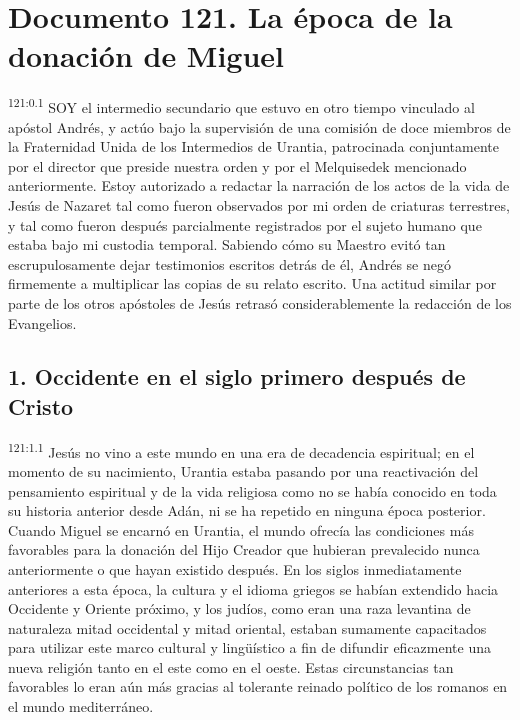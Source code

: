 \chapter{Documento 121. La época de la donación de Miguel}
\par 
\textsuperscript{121:0.1} SOY el intermedio secundario que estuvo en otro tiempo vinculado al apóstol Andrés, y actúo bajo la supervisión de una comisión de doce miembros de la Fraternidad Unida de los Intermedios de Urantia, patrocinada conjuntamente por el director que preside nuestra orden y por el Melquisedek mencionado anteriormente. Estoy autorizado a redactar la narración de los actos de la vida de Jesús de Nazaret tal como fueron observados por mi orden de criaturas terrestres, y tal como fueron después parcialmente registrados por el sujeto humano que estaba bajo mi custodia temporal. Sabiendo cómo su Maestro evitó tan escrupulosamente dejar testimonios escritos detrás de él, Andrés se negó firmemente a multiplicar las copias de su relato escrito. Una actitud similar por parte de los otros apóstoles de Jesús retrasó considerablemente la redacción de los Evangelios.

\section*{1. Occidente en el siglo primero después de Cristo}
\par 
\textsuperscript{121:1.1} Jesús no vino a este mundo en una era de decadencia espiritual; en el momento de su nacimiento, Urantia estaba pasando por una reactivación del pensamiento espiritual y de la vida religiosa como no se había conocido en toda su historia anterior desde Adán, ni se ha repetido en ninguna época posterior. Cuando Miguel se encarnó en Urantia, el mundo ofrecía las condiciones más favorables para la donación del Hijo Creador que hubieran prevalecido nunca anteriormente o que hayan existido después. En los siglos inmediatamente anteriores a esta época, la cultura y el idioma griegos se habían extendido hacia Occidente y Oriente próximo, y los judíos, como eran una raza levantina de naturaleza mitad occidental y mitad oriental, estaban sumamente capacitados para utilizar este marco cultural y ling\"uístico a fin de difundir eficazmente una nueva religión tanto en el este como en el oeste. Estas circunstancias tan favorables lo eran aún más gracias al tolerante reinado político de los romanos en el mundo mediterráneo.

